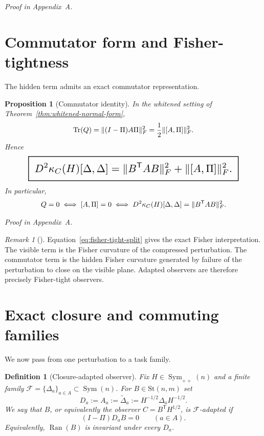 \documentclass[11pt,a4paper]{article}
\numberwithin{equation}{section}
\DeclareMathOperator{\Tr}{Tr}
\DeclareMathOperator{\Ran}{Ran}
\DeclareMathOperator{\Sym}{Sym}
\DeclarePairedDelimiter{\norm}{\lVert}{\rVert}
\newcommand{\St}{\mathrm{St}}
\newcommand{\geomboxed}[1]{%
  \setlength{\fboxsep}{8pt}%
  \setlength{\fboxrule}{0.9pt}%
  \fbox{\scalebox{1.5}{$\displaystyle #1$}}%
}
\theoremstyle{thmcompact}
\newtheorem{proposition}[theorem]{Proposition}
\newtheorem{definition}[theorem]{Definition}
\theoremstyle{remark}
\newtheorem*{remarkplain}{Remark}
\newenvironment{remark}[1][]%
{\begin{remarkbox}\begin{remarkplain}[#1]\normalfont}
{\end{remarkplain}\end{remarkbox}}
\newcommand{\proofappendix}{\par{\hfill\scriptsize\emph{Proof in Appendix~A.}}\par}
\begin{document}
\proofappendix

\section{Commutator form and Fisher-tightness}

The hidden term admits an exact commutator representation.

\begin{proposition}[Commutator identity]
\label{prop:commutator-identity}
In the whitened setting of Theorem~\ref{thm:whitened-normal-form},
\begin{equation}
\Tr(Q)=\norm{(I-\Pi)A\Pi}_F^2=\frac12\norm{[A,\Pi]}_F^2.
\label{eq:commutator-identity}
\end{equation}
Hence
\begin{equation}
\geomboxed{D^2\kappa_C(H)[\Delta,\Delta]=\norm{B^{\mathsf T}AB}_F^2+\norm{[A,\Pi]}_F^2.}
\label{eq:fisher-tight-split}
\end{equation}
In particular,
\begin{equation}
Q=0
\iff
[A,\Pi]=0
\iff
D^2\kappa_C(H)[\Delta,\Delta]=\norm{B^{\mathsf T}AB}_F^2.
\label{eq:fisher-tight-equivalence}
\end{equation}
\end{proposition}

\proofappendix

\begin{remark}
Equation~\eqref{eq:fisher-tight-split} gives the exact Fisher interpretation. The visible term is the Fisher curvature of the compressed perturbation. The commutator term is the hidden Fisher curvature generated by failure of the perturbation to close on the visible plane. Adapted observers are therefore precisely Fisher-tight observers.
\end{remark}

\section{Exact closure and commuting families}

We now pass from one perturbation to a task family.

\begin{definition}[Closure-adapted observer]
\label{def:closure-adapted}
Fix $H\in\Sym_{++}(n)$ and a finite family $\mathcal F=\{\Delta_a\}_{a\in A}\subset \Sym(n)$. For $B\in\St(n,m)$ set
\begin{equation}
D_a:=A_a:=\widetilde\Delta_a:=H^{-1/2}\Delta_aH^{-1/2}.
\label{eq:family-whitened}
\end{equation}
We say that $B$, or equivalently the observer $C=B^{\mathsf T}H^{1/2}$, is \emph{$\mathcal F$-adapted} if
\begin{equation}
(I-\Pi)D_aB=0
\qquad (a\in A).
\label{eq:F-adapted}
\end{equation}
Equivalently, $\Ran(B)$ is invariant under every $D_a$.
\end{definition}
\end{document}
